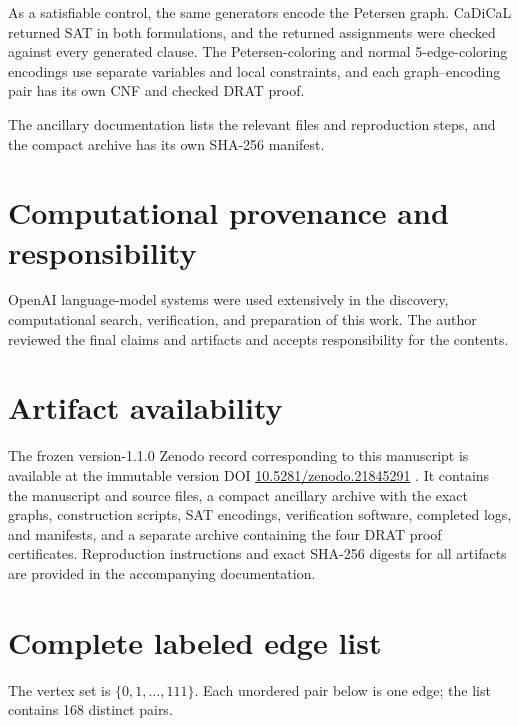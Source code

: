 \documentclass[11pt]{article}
\begin{document}
As a satisfiable control, the same generators encode the Petersen graph.
CaDiCaL returned SAT in both formulations, and the returned assignments were
checked against every generated clause.  The Petersen-coloring and normal
5-edge-coloring encodings use separate variables and local constraints, and
each graph--encoding pair has its own CNF and checked DRAT proof.

The ancillary documentation lists the relevant files and reproduction steps,
and the compact archive has its own SHA-256 manifest.

\section*{Computational provenance and responsibility}

OpenAI language-model systems were used extensively in the discovery,
computational search, verification, and preparation of this work.  The author
reviewed the final claims and artifacts and accepts responsibility for the
contents.

\clearpage
\section*{Artifact availability}

The frozen version-1.1.0 Zenodo record corresponding to this manuscript is
available at the immutable version DOI
\href{https://doi.org/10.5281/zenodo.21845291}{10.5281/zenodo.21845291}
\cite{PutmanZenodo2026}.  It contains the manuscript and source files, a compact
ancillary archive with the exact graphs, construction scripts, SAT encodings,
verification software, completed logs, and manifests, and a separate archive
containing the four DRAT proof certificates.  Reproduction instructions and
exact SHA-256 digests for all artifacts are provided in the accompanying
documentation.

\clearpage
\appendix
\section{Complete labeled edge list}\label{app:edges}

The vertex set is \(\{0,1,\ldots,111\}\).  Each unordered pair below is one
edge; the list contains 168 distinct pairs.
\end{document}
